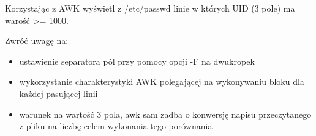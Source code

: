 % 
% 
% 
% 




\dbEntryCheckResults
Korzystając z AWK wyświetl z /etc/passwd linie w których UID (3 pole) ma warość >= 1000.
\fi
{}\dbEntryCheckResults
{}

\noindent Zwróć uwagę na:
\begin{itemize}
\item ustawienie separatora pól przy pomocy opcji -F na dwukropek
\item wykorzystanie charakterystyki AWK polegającej na wykonywaniu bloku dla każdej pasującej linii
\item warunek na wartość 3 pola, awk sam zadba o konwersję napisu przeczytanego z pliku na liczbę celem wykonania tego porównania
\end{itemize}
\fi


